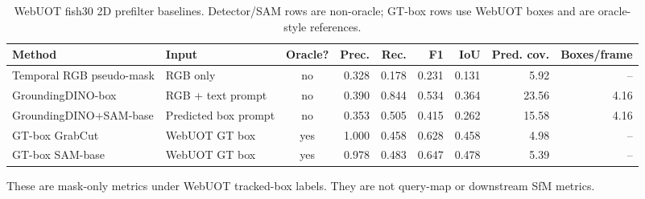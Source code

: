 \begin{table}[t]
\centering
\small
\caption{WebUOT fish30 2D prefilter baselines. Detector/SAM rows are non-oracle; GT-box rows use WebUOT boxes and are oracle-style references.}
\label{tab:aqua_prefilter_baselines}
\begin{tabular}{llcrrrrrr}
\toprule
Method & Input & Oracle? & Prec. & Rec. & F1 & IoU & Pred. cov. & Boxes/frame \\
\midrule
Temporal RGB pseudo-mask & RGB only & no & 0.328 & 0.178 & 0.231 & 0.131 & 5.92 & -- \\
GroundingDINO-box & RGB + text prompt & no & 0.390 & 0.844 & 0.534 & 0.364 & 23.56 & 4.16 \\
GroundingDINO+SAM-base & Predicted box prompt & no & 0.353 & 0.505 & 0.415 & 0.262 & 15.58 & 4.16 \\
GT-box GrabCut & WebUOT GT box & yes & 1.000 & 0.458 & 0.628 & 0.458 & 4.98 & -- \\
GT-box SAM-base & WebUOT GT box & yes & 0.978 & 0.483 & 0.647 & 0.478 & 5.39 & -- \\
\bottomrule
\end{tabular}
\vspace{0.25em}
\footnotesize{These are mask-only metrics under WebUOT tracked-box labels. They are not query-map or downstream SfM metrics.}
\end{table}
